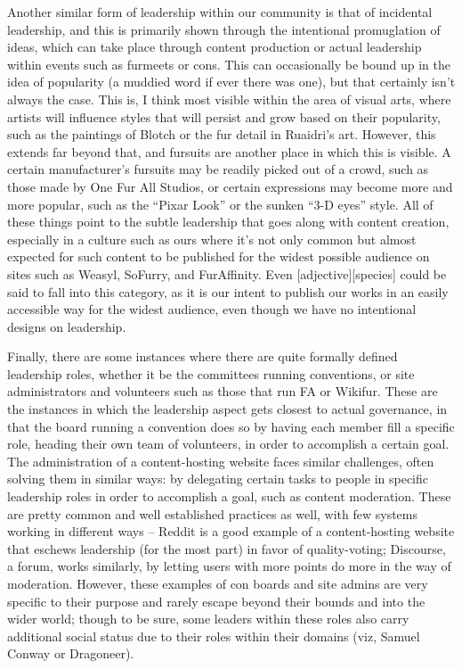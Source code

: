 Another similar form of leadership within our community is that of incidental leadership, and this is primarily shown through the intentional promuglation of ideas, which can take place through content production or actual leadership within events such as furmeets or cons. This can occasionally be bound up in the idea of popularity (a muddied word if ever there was one), but that certainly isn’t always the case. This is, I think most visible within the area of visual arts, where artists will influence styles that will persist and grow based on their popularity, such as the paintings of Blotch or the fur detail in Ruaidri’s art. However, this extends far beyond that, and fursuits are another place in which this is visible. A certain manufacturer’s fursuits may be readily picked out of a crowd, such as those made by One Fur All Studios, or certain expressions may become more and more popular, such as the ``Pixar Look'' or the sunken ``3-D eyes'' style. All of these things point to the subtle leadership that goes along with content creation, especially in a culture such as ours where it’s not only common but almost expected for such content to be published for the widest possible audience on sites such as Weasyl, SoFurry, and FurAffinity. Even [adjective][species] could be said to fall into this category, as it is our intent to publish our works in an easily accessible way for the widest audience, even though we have no intentional designs on leadership.

Finally, there are some instances where there are quite formally defined leadership roles, whether it be the committees running conventions, or site administrators and volunteers such as those that run FA or Wikifur. These are the instances in which the leadership aspect gets closest to actual governance, in that the board running a convention does so by having each member fill a specific role, heading their own team of volunteers, in order to accomplish a certain goal. The administration of a content-hosting website faces similar challenges, often solving them in similar ways: by delegating certain tasks to people in specific leadership roles in order to accomplish a goal, such as content moderation. These are pretty common and well established practices as well, with few systems working in different ways -- Reddit is a good example of a content-hosting website that eschews leadership (for the most part) in favor of quality-voting; Discourse, a forum, works similarly, by letting users with more points do more in the way of moderation. However, these examples of con boards and site admins are very specific to their purpose and rarely escape beyond their bounds and into the wider world; though to be sure, some leaders within these roles also carry additional social status due to their roles within their domains (viz, Samuel Conway or Dragoneer).

